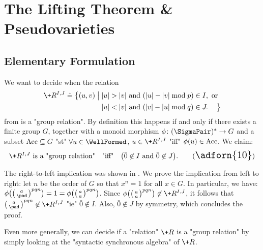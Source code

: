 \section{The Lifting Theorem \& Pseudovarieties}
\label{sec:lifting-theorem}

\subsection{Elementary Formulation}

\begin{example}
	\AP\label{ex:charac-group-relation-monoids}
	We want to decide when the relation
	\begin{align*}
		\+R^{I,J} \defeq \big\{
			(u,v) \;\big\vert\; & |u| > |v| \text{ and } (|u| - |v| \bmod{p}) \in I, \text{ or} \\
			& |u| < |v| \text{ and } (|v| - |u| \bmod{q}) \in J.
		\hphantom{\text{ or}}\big\}	
	\end{align*}
	from  is a \AP"group relation".
	By definition this happens if and only if there exists a finite group $G$,
	together with a monoid morphism $\phi\colon (\SigmaPair)^* \to G$ and a subset
	$\textrm{Acc} \subseteq G$ "st" $\forall u \in \WellFormed$, $u\in \+R^{I,J}$ "iff" $\phi(u) \in \textrm{Acc}$.
	We claim:
	\begin{equation}
		\+R^{I,J} \text{ is a "group relation"}\quad\text{"iff"}\quad
		\big(
			\bar 0 \not\in I \text{ and } \bar 0 \not\in J
		\big).
		\tag{{\Large\adforn{10}}}
	\end{equation}

	The right-to-left implication was shown in .
	We prove the implication from left to right:
	let $n$ be the order of $G$ so that $x^n = 1$ for all $x\in G$. In particular, we have:
	$\phi\bigl(\pair{a}{\pad}^{pqn}\bigr) = 1 = \phi\bigl(\pair{a}{a}^{pqn}\bigr)$.
	Since $\phi\bigl(\pair{a}{a}^{pqn}\bigr) \not\in \+R^{I,J}$, it follows that 
	$\pair{a}{\pad}^{pqn} \not\in \+R^{I,J}$
	"ie" $\bar 0 \not\in I$. Also, $\bar 0 \not\in J$ by symmetry, which concludes the proof.
\end{example}

\AP{}
Even more generally, we can decide if a "relation" $\+R$ is a "group relation"
by simply looking at the "syntactic synchronous algebra" of $\+R$.

\liftingtheoremmonoids

